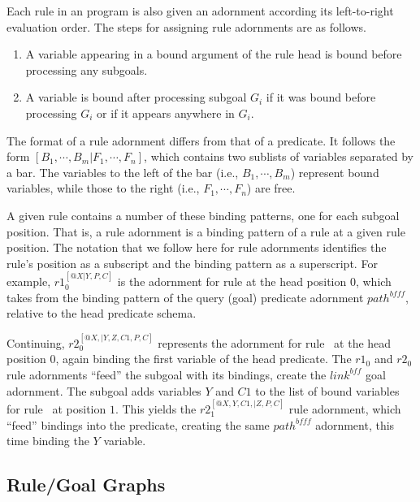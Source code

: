 Each rule in an \OVERLOG program is also given an adornment according its
left-to-right evaluation order.  The steps for assigning rule adornments are as
follows.
\begin{enumerate}
    \ssp
    \item A variable appearing in a bound argument of the rule head is bound before processing any subgoals.
    \item A variable is bound after processing subgoal $G_i$ if it was bound 
          before processing $G_i$ or if it appears anywhere in $G_i$.
\end{enumerate}
The format of a rule adornment differs from that of a predicate.  It follows the form
$[B_1,\cdots,B_m|F_1,\cdots,F_n]$, which contains two sublists of variables
separated by a bar.  The variables to the left of the bar (i.e.,
$B_1,\cdots,B_m$) represent bound variables, while those to the right (i.e.,
$F_1,\cdots,F_n$) are free. 

A given rule contains a number of these binding patterns, one for each subgoal
position.  That is, a rule adornment is a binding pattern of a rule at a given
rule position.  The notation that we follow here for rule adornments identifies
the rule's position as a subscript and the binding pattern as a superscript.
For example, $r1_0^{[@X|Y,P,C]}$ is the adornment for rule  at the head
position $0$, which takes from the binding pattern of the query (goal)
predicate adornment $path^{bfff}$, relative to the head predicate schema.

Continuing, $r2_0^{[@X,|Y,Z,C1,P,C]}$ represents the adornment for rule~
at the head position $0$, again binding the first variable of the head
predicate.  The $r1_0$ and $r2_0$ rule adornments ``feed'' the 
subgoal with its bindings, create the $link^{bff}$ goal adornment.  The
 subgoal adds variables $Y$ and $C1$ to the list of bound variables
for rule~ at position $1$.  This yields the $r2_1^{[@X,Y,C1,|Z,P,C]}$
rule adornment, which ``feed'' bindings into the  predicate, creating
the same $path^{bfff}$ adornment, this time binding the $Y$ variable.

\subsection{Rule/Goal Graphs}

